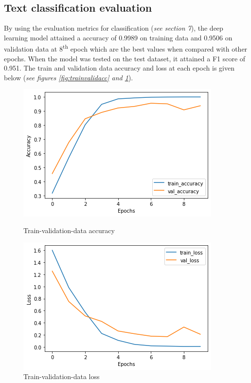 \documentclass[a4paper,4pt]{article}
\begin{document}
\subsection{Text classification evaluation}
By using the evaluation metrics for classification (\textit{see section 7}), the deep learning model attained a accuracy of 0.9989 on training data and 0.9506 on validation data
at 8\textsuperscript{th} epoch which are the best values when compared with other epochs. When the model was tested on the test 
dataset, it attained a F1 score of 0.951. The train and validation
data accuracy and loss at each epoch is given below (\textit{see figures \ref{fig:trainvalidacc} and \ref{fig:trainvalidloss}}).
\begin{center}
    \begin{figure}[h]
        \begin{minipage}{.5\textwidth}
            \centering
            \includegraphics[scale=0.5]{images/text_classification_accuracy.png}
            \caption{Train-validation-data accuracy}
            \label{fig:trainvalidacc}
        \end{minipage}
        \begin{minipage}{.5\textwidth}
            \centering
            \includegraphics[scale=0.5]{images/text_classification_loss.png}
            \caption{Train-validation-data loss}
            \label{fig:trainvalidloss}
        \end{minipage}
    \end{figure} 
\end{center}
\end{document}
